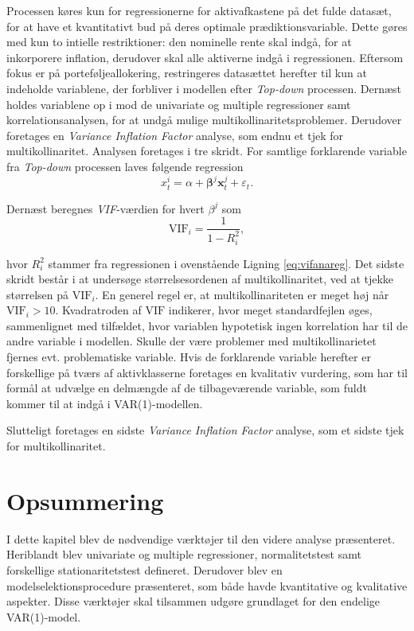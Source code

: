 \documentclass[
  a4paper,
  oneside]{memoir}
\begin{document}
Processen køres kun for regressionerne for aktivafkastene på det fulde datasæt, for at have et kvantitativt bud på deres optimale prædiktionsvariable. Dette gøres med kun to intielle restriktioner: den nominelle rente skal indgå, for at inkorporere inflation, derudover skal alle aktiverne indgå i regressionen. Eftersom fokus er på porteføljeallokering, restringeres datasættet herefter til kun at indeholde variablene, der forbliver i modellen efter \emph{Top-down} processen. Dernæst holdes variablene op i mod de univariate og multiple regressioner samt korrelationsanalysen, for at undgå mulige multikollinaritetsproblemer. Derudover foretages en \emph{Variance Inflation Factor} analyse, som endnu et tjek for multikollinaritet. Analysen foretages i tre skridt. For samtlige forklarende variable fra \emph{Top-down} processen laves følgende regression
\begin{equation}
x_t^i=\alpha+\bm{\beta}^j\bm{x}_t^{j}+\varepsilon_t. \label{eq:vifanareg}
\end{equation}

Dernæst beregnes \emph{VIF}-værdien for hvert \(\beta^j\) som
\[\text{VIF}_i=\frac{1}{1-R_i^2},\]

hvor \(R_i^2\) stammer fra regressionen i ovenstående Ligning \eqref{eq:vifanareg}. Det sidste skridt består i at undersøge størrelsesordenen af multikollinaritet, ved at tjekke størrelsen på \(\text{VIF}_i\). En generel regel er, at multikollinariteten er meget høj når \(\text{VIF}_i>10\). Kvadratroden af \(\text{VIF}\) indikerer, hvor meget standardfejlen øges, sammenlignet med tilfældet, hvor variablen hypotetisk ingen korrelation har til de andre variable i modellen. Skulle der være problemer med multikollinarietet fjernes evt. problematiske variable. Hvis de forklarende variable herefter er forskellige på tværs af aktivklasserne foretages en kvalitativ vurdering, som har til formål at udvælge en delmængde af de tilbageværende variable, som fuldt kommer til at indgå i VAR(1)-modellen.

Slutteligt foretages en sidste \emph{Variance Inflation Factor} analyse, som et sidste tjek for multikollinaritet.

\hypertarget{opsummering-2}{%
\section{Opsummering}\label{opsummering-2}}

I dette kapitel blev de nødvendige værktøjer til den videre analyse præsenteret. Heriblandt blev univariate og multiple regressioner, normalitetstest samt forskellige stationaritetstest defineret. Derudover blev en modelselektionsprocedure præsenteret, som både havde kvantitative og kvalitative aspekter. Disse værktøjer skal tilsammen udgøre grundlaget for den endelige VAR(1)-model.
\end{document}
